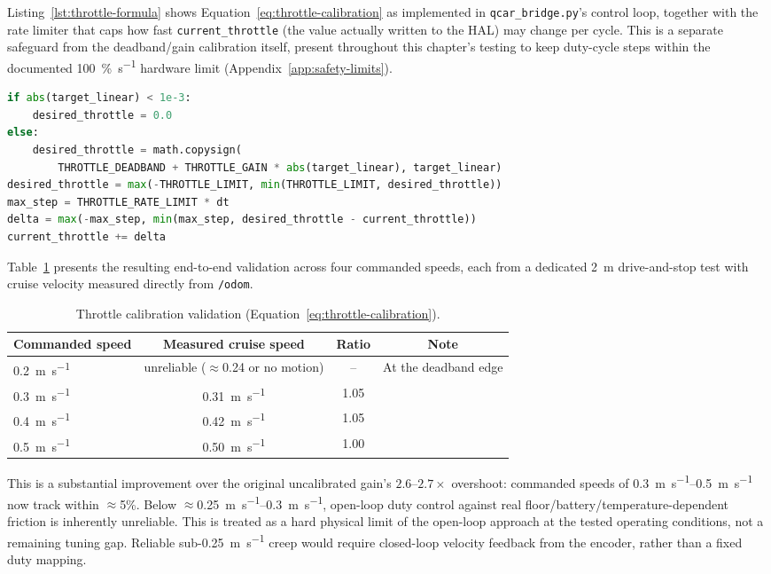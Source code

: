 Listing~\ref{lst:throttle-formula} shows Equation~\ref{eq:throttle-calibration}
as implemented in \texttt{qcar\_bridge.py}'s control loop, together
with the rate limiter that caps how fast \texttt{current\_throttle}
(the value actually written to the HAL) may change per cycle. This is
a separate safeguard from the deadband/gain calibration itself,
present throughout this chapter's testing to keep duty-cycle steps
within the documented \SI{100}{\percent\per\second} hardware limit
(Appendix~\ref{app:safety-limits}).

\begin{lstlisting}[language=Python,caption={Duty-cycle command computation and rate limiting (\texttt{qcar\_bridge.py}).},label={lst:throttle-formula}]
if abs(target_linear) < 1e-3:
    desired_throttle = 0.0
else:
    desired_throttle = math.copysign(
        THROTTLE_DEADBAND + THROTTLE_GAIN * abs(target_linear), target_linear)
desired_throttle = max(-THROTTLE_LIMIT, min(THROTTLE_LIMIT, desired_throttle))
max_step = THROTTLE_RATE_LIMIT * dt
delta = max(-max_step, min(max_step, desired_throttle - current_throttle))
current_throttle += delta
\end{lstlisting}

Table~\ref{tab:calibration-validation} presents the resulting
end-to-end validation across four commanded speeds, each from a
dedicated \SI{2}{\meter} drive-and-stop test with cruise velocity
measured directly from \texttt{/odom}.

\begin{table}[htbp]
  \centering
  \caption{Throttle calibration validation (Equation~\ref{eq:throttle-calibration}).}
  \label{tab:calibration-validation}
  \begin{tabular}{@{}lccc@{}}
    \toprule
    Commanded speed & Measured cruise speed & Ratio & Note \\
    \midrule
    \SI{0.2}{\meter\per\second} & unreliable ($\approx$0.24 or no motion) & -- & At the deadband edge \\
    \SI{0.3}{\meter\per\second} & \SI{0.31}{\meter\per\second} & 1.05 & \\
    \SI{0.4}{\meter\per\second} & \SI{0.42}{\meter\per\second} & 1.05 & \\
    \SI{0.5}{\meter\per\second} & \SI{0.50}{\meter\per\second} & 1.00 & \\
    \bottomrule
  \end{tabular}
\end{table}

This is a substantial improvement over the original uncalibrated
gain's $2.6$--$2.7\times$ overshoot: commanded speeds of
\SIrange{0.3}{0.5}{\meter\per\second} now track within
$\approx$5\%. Below $\approx$\SIrange{0.25}{0.3}{\meter\per\second},
open-loop duty control against real floor/battery/temperature-dependent
friction is inherently unreliable. This is treated as a hard
physical limit of the open-loop approach at the tested operating
conditions, not a remaining tuning gap. Reliable
sub-\SI{0.25}{\meter\per\second} creep would require closed-loop
velocity feedback from the encoder, rather than a fixed duty
mapping.

